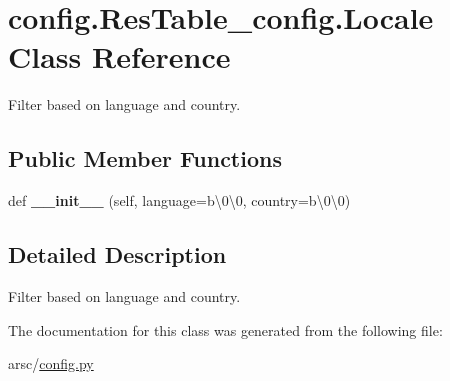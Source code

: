 \hypertarget{classconfig_1_1ResTable__config_1_1Locale}{}\section{config.\+Res\+Table\+\_\+config.\+Locale Class Reference}
\label{classconfig_1_1ResTable__config_1_1Locale}


Filter based on language and country.  


\subsection*{Public Member Functions}
\begin{DoxyCompactItemize}
\item 
\mbox{\label{classconfig_1_1ResTable__config_1_1Locale_aae229a0fbc79e8133df1b72ec10994dc}} 
def {\bfseries \+\_\+\+\_\+init\+\_\+\+\_\+} (self, language=b\textquotesingle{}\textbackslash{}0\textbackslash{}0\textquotesingle{}, country=b\textquotesingle{}\textbackslash{}0\textbackslash{}0\textquotesingle{})
\end{DoxyCompactItemize}


\subsection{Detailed Description}
Filter based on language and country. 

The documentation for this class was generated from the following file\+:\begin{DoxyCompactItemize}
\item 
arsc/\mbox{\hyperlink{config_8py}{config.\+py}}\end{DoxyCompactItemize}
